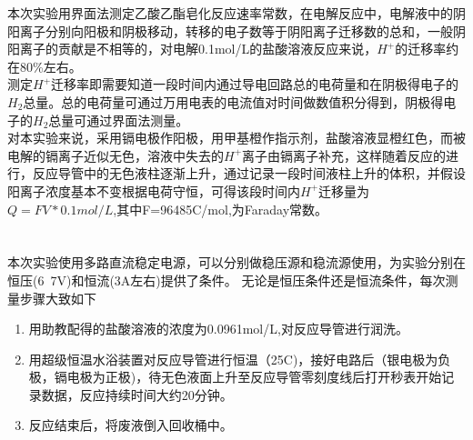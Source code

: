 ﻿\documentclass[10.5pt]{ctexart}
\begin{document}
\title{\textbf{}} %
\author{}
\maketitle
\section{\textbf{}}
本次实验用界面法测定乙酸乙酯皂化反应速率常数，在电解反应中，电解液中的阴阳离子分别向阳极和阴极移动，转移的电子数等于阴阳离子迁移数的总和，一般阴阳离子的贡献是不相等的，对电解0.1mol/L的盐酸溶液反应来说，$H^+$的迁移率约在80\%左右。\\
测定$H^+$迁移率即需要知道一段时间内通过导电回路总的电荷量和在阴极得电子的$H_2$总量。总的电荷量可通过万用电表的电流值对时间做数值积分得到，阴极得电子的$H_2$总量可通过界面法测量。\\
对本实验来说，采用镉电极作阳极，用甲基橙作指示剂，盐酸溶液显橙红色，而被电解的镉离子近似无色，溶液中失去的$H^+$离子由镉离子补充，这样随着反应的进行，反应导管中的无色液柱逐渐上升，通过记录一段时间液柱上升的体积，并假设阳离子浓度基本不变根据电荷守恒，可得该段时间内$H^+$迁移量为$Q=FV*0.1mol/L$,其中F=96485C/mol,为Faraday常数。
\section{\textbf{}}

\subsection{\textbf{}}
本次实验使用多路直流稳定电源，可以分别做稳压源和稳流源使用，为实验分别在恒压(6~7V)和恒流(3A左右)提供了条件。
无论是恒压条件还是恒流条件，每次测量步骤大致如下
\begin{enumerate}
\item 用助教配得的盐酸溶液的浓度为0.0961mol/L,对反应导管进行润洗。
\item 用超级恒温水浴装置对反应导管进行恒温（25\degree C)，接好电路后（银电极为负极，镉电极为正极)，待无色液面上升至反应导管零刻度线后打开秒表开始记录数据，反应持续时间大约20分钟。
\item 反应结束后，将废液倒入回收桶中。
\end{enumerate}
\section{\textbf{}}
\end{document}
